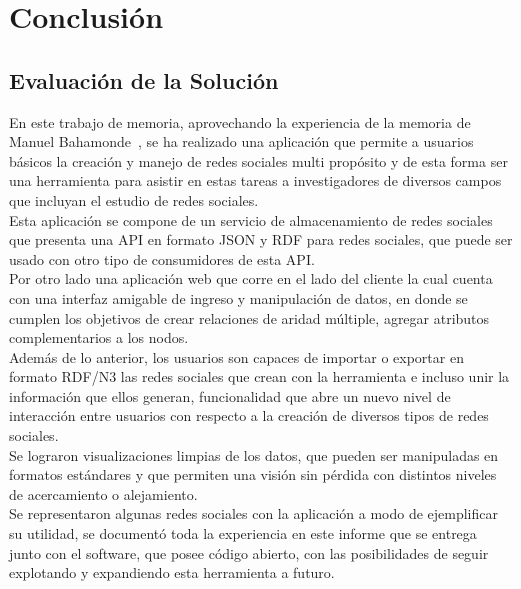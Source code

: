 \chapter{Conclusión}

\section{Evaluación de la Solución} %
\label{sec:evaluacion_de_la_solucion}

En este trabajo de memoria, aprovechando la experiencia de la memoria de Manuel Bahamonde~\cite{memoriamanuel}, se ha realizado una aplicación que permite a usuarios básicos la creación y manejo de redes sociales multi propósito y de esta forma ser una herramienta para asistir en estas tareas a investigadores de diversos campos que incluyan el estudio de redes sociales.\\

Esta aplicación se compone de un servicio de almacenamiento de redes sociales que presenta una API en formato JSON y RDF para redes sociales, que puede ser usado con otro tipo de consumidores de esta API.\\

Por otro lado una aplicación web que corre en el lado del cliente la cual cuenta con una interfaz amigable de ingreso y manipulación de datos, en donde se cumplen los objetivos de crear relaciones de aridad múltiple, agregar atributos complementarios a los nodos.\\

Además de lo anterior, los usuarios son capaces de importar o exportar en formato RDF/N3 las redes sociales que crean con la herramienta e incluso unir la información que ellos generan, funcionalidad que abre un nuevo nivel de interacción entre usuarios con respecto a la creación de diversos tipos de redes sociales.\\

Se lograron visualizaciones limpias de los datos, que pueden ser manipuladas en formatos estándares y que permiten una visión sin pérdida con distintos niveles de acercamiento o alejamiento.\\

Se representaron algunas redes sociales con la aplicación a modo de ejemplificar su utilidad, se documentó toda la experiencia en este informe que se entrega junto con el software, que posee código abierto, con las posibilidades de seguir explotando y expandiendo esta herramienta a futuro.

